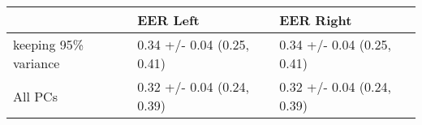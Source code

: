 \begin{tabular}{lll}
\toprule
{} &                    EER Left &                   EER Right \\
\midrule
keeping 95\% variance &  0.34 +/- 0.04 (0.25, 0.41) &  0.34 +/- 0.04 (0.25, 0.41) \\
All PCs              &  0.32 +/- 0.04 (0.24, 0.39) &  0.32 +/- 0.04 (0.24, 0.39) \\
\bottomrule
\end{tabular}

